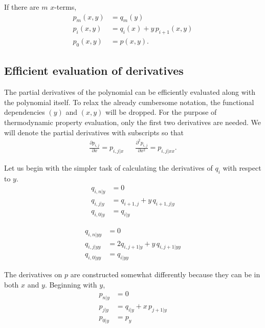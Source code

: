If there are $m$ $x$-terms,
\begin{subequations}
\begin{align}
p_m(x,y) &= q_m(y)\\
p_i(x,y) &= q_i(x) + y\,p_{i+1}(x,y)\\
p_0(x,y) &= p(x,y).
\end{align}
\end{subequations}

\subsection{Efficient evaluation of derivatives}

The partial derivatives of the polynomial can be efficiently evaluated along with the polynomial itself. To relax the already cumbersome notation, the functional dependencies $(y)$ and $(x,y)$ will be dropped.  For the purpose of thermodynamic property evaluation, only the first two derivatives are needed.  We will denote the partial derivatives with subscripts so that 
\begin{align*}
\frac{\partial p_{i,j}}{\partial x} = p_{i,j|x} && \frac{\partial^2 p_{i,j}}{\partial x^2} = p_{i,j|xx}.
\end{align*}

Let us begin with the simpler task of calculating the derivatives of $q_i$ with respect to $y$.
\begin{subequations}
\begin{align}
q_{i,n|y} &= 0\\
q_{i,j|y} &= q_{i+1,j} + y\,q_{i+1,j|y}\\
q_{i,0|y} &= q_{i|y}
\end{align}
\end{subequations}

\begin{subequations}
\begin{align}
q_{i,n|yy} &= 0\\
q_{i,j|yy} &= 2 q_{i,j+1|y} + y\,q_{i,j+1|yy}\\
q_{i,0|yy} &= q_{i|yy}
\end{align}
\end{subequations}

The derivatives on $p$ are constructed somewhat differently because they can be in both $x$ and $y$.  Beginning with $y$,
\begin{subequations}
\begin{align}
p_{n|y} &= 0\\
p_{j|y} &= q_{i|y} + x\,p_{j+1|y}\\
p_{0|y} &= p_y
\end{align}
\end{subequations}

